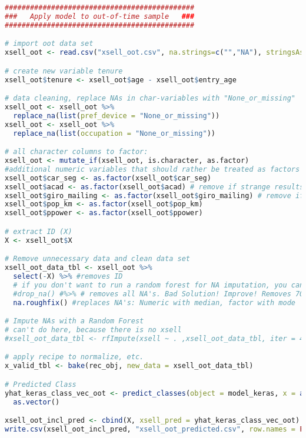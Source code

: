\begin{lstlisting}[language=R,caption={Using the ANN to predict the previously unseen out-of-time data set}, label=lst_oot]
#############################################
###   Apply model to out-of-time sample   ###
#############################################

# import oot data set
xsell_oot <- read.csv("xsell_oot.csv", na.strings=c("","NA"), stringsAsFactors = FALSE)

# create new variable tenure
xsell_oot$tenure <- xsell_oot$age - xsell_oot$entry_age

# data cleaning, replace NAs in char-variables with "None_or_missing"
xsell_oot <- xsell_oot %>%
  replace_na(list(pref_device = "None_or_missing"))
xsell_oot <- xsell_oot %>%
  replace_na(list(occupation = "None_or_missing"))

# all character columns to factor:
xsell_oot <- mutate_if(xsell_oot, is.character, as.factor)
#additional numeric variables that should rather be treated as factors
xsell_oot$car_seg <- as.factor(xsell_oot$car_seg)
xsell_oot$acad <- as.factor(xsell_oot$acad) # remove if strange results
xsell_oot$giro_mailing <- as.factor(xsell_oot$giro_mailing) # remove if strange results
xsell_oot$pop_km <- as.factor(xsell_oot$pop_km)
xsell_oot$ppower <- as.factor(xsell_oot$ppower)

# extract ID (X)
X <- xsell_oot$X

# Remove unnecessary data and clean data set
xsell_oot_data_tbl <- xsell_oot %>%
  select(-X) %>% #removes ID
  # if you don't want to run a random forest for NA imputation, you can do apply of the two easier fixes to NA's:
  #drop_na() #%>% # removes all NA's. Bad Solution! Improve! Removes 70% of observations
  na.roughfix() #replaces NA's: Numeric with median, factor with mode

# Impute NAs with a Random Forest
# can't do here, because there is no xsell
#xsell_oot_data_tbl <- rfImpute(xsell ~ . ,xsell_oot_data_tbl, iter = 4, ntree=100) 

# apply recipe to normalize, etc.
x_valid_tbl <- bake(rec_obj, new_data = xsell_oot_data_tbl)

# Predicted Class
yhat_keras_class_vec_oot <- predict_classes(object = model_keras, x = as.matrix(x_valid_tbl)) %>%
  as.vector()

xsell_oot_incl_pred <- cbind(X, xsell_pred = yhat_keras_class_vec_oot)
write.csv(xsell_oot_incl_pred, "xsell_oot_predicted.csv", row.names = FALSE)

      
\end{lstlisting}